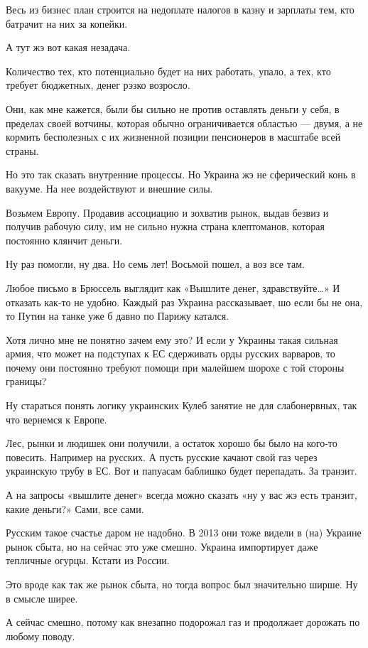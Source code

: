 \begin{multicols}{2}
Весь из бизнес план строится на недоплате налогов в казну и зарплаты тем, кто
батрачит на них за копейки.

А тут жэ вот какая незадача.

Количество тех, кто потенциально будет на них работать, упало, а тех, кто
требует бюджетных, денег рэзко возросло.

Они, как мне кажется, были бы сильно не против оставлять деньги у себя, в
пределах своей вотчины, которая обычно ограничивается областью — двумя, а не
кормить бесполезных с их жизненной позиции пенсионеров в масштабе всей страны.

Но это так сказать внутренние процессы. Но Украина жэ не сферический конь в
вакууме. На нее воздействуют и внешние силы.

Возьмем Европу. Продавив ассоциацию и зохватив рынок, выдав безвиз и получив
рабочую силу, им не сильно нужна страна клептоманов, которая постоянно клянчит
деньги.

Ну раз помогли, ну два. Но семь лет! Восьмой пошел, а воз все там.

Любое письмо в Брюссель выглядит как «Вышлите денег, здравствуйте…» И отказать
как-то не удобно. Каждый раз Украина рассказывает, шо если бы не она, то Путин
на танке уже б давно по Парижу катался.

Хотя лично мне не понятно зачем ему это? И если у Украины такая сильная армия,
что может на подступах к ЕС сдерживать орды русских варваров, то почему они
постоянно требуют помощи при малейшем шорохе с той стороны границы?

Ну стараться понять логику украинских Кулеб занятие не для слабонервных, так
что вернемся к Европе.

Лес, рынки и людишек они получили, а остаток хорошо бы было на кого-то
повесить. Например на русских. А пусть русские качают свой газ через украинскую
трубу в ЕС. Вот и папуасам баблишко будет перепадать. За транзит.

А на запросы «вышлите денег» всегда можно сказать «ну у вас жэ есть транзит,
какие деньги?» Сами, все сами.

Русским такое счастье даром не надобно. В 2013 они тоже видели в (на) Украине
рынок сбыта, но на сейчас это уже смешно. Украина импортирует даже тепличные
огурцы. Кстати из России.

Это вроде как так же рынок сбыта, но тогда вопрос был значительно ширше. Ну в
смысле ширее.

А сейчас смешно, потому как внезапно подорожал газ и продолжает дорожать по
любому поводу.


\end{multicols}
